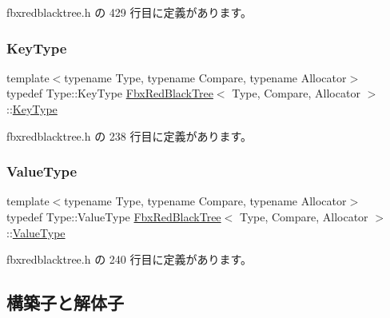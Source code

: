  fbxredblacktree.\+h の 429 行目に定義があります。

\mbox{\label{class_fbx_red_black_tree_a241b31c6972995417d193458b7bb27e2}} 
\subsubsection{\texorpdfstring{Key\+Type}{KeyType}}
{\footnotesize\ttfamily template$<$typename Type, typename Compare, typename Allocator$>$ \\
typedef Type\+::\+Key\+Type \hyperlink{class_fbx_red_black_tree}{Fbx\+Red\+Black\+Tree}$<$ Type, Compare, Allocator $>$\+::\hyperlink{class_fbx_red_black_tree_a241b31c6972995417d193458b7bb27e2}{Key\+Type}}



 fbxredblacktree.\+h の 238 行目に定義があります。

\mbox{\label{class_fbx_red_black_tree_a178e34888fa8c0fab5a7527ab30a663c}} 
\subsubsection{\texorpdfstring{Value\+Type}{ValueType}}
{\footnotesize\ttfamily template$<$typename Type, typename Compare, typename Allocator$>$ \\
typedef Type\+::\+Value\+Type \hyperlink{class_fbx_red_black_tree}{Fbx\+Red\+Black\+Tree}$<$ Type, Compare, Allocator $>$\+::\hyperlink{class_fbx_red_black_tree_a178e34888fa8c0fab5a7527ab30a663c}{Value\+Type}}



 fbxredblacktree.\+h の 240 行目に定義があります。



\subsection{構築子と解体子}
\mbox{\label{class_fbx_red_black_tree_a53f5ee11b3aa618b7ebc7b2ff1654d40}} 
